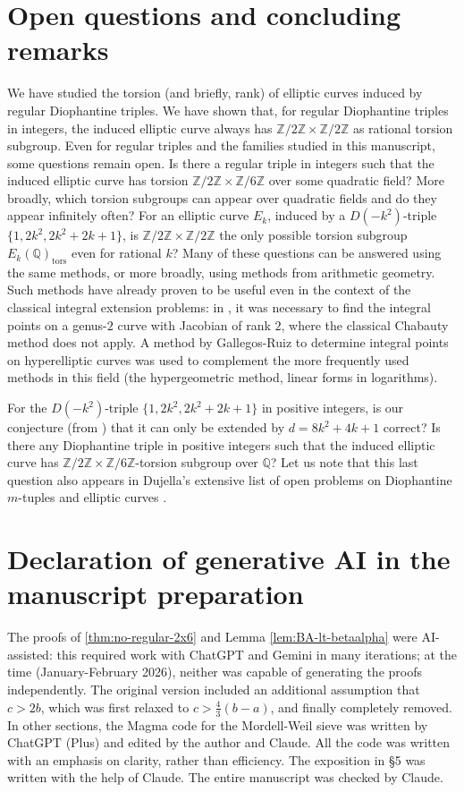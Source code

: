 \documentclass{article}
\theoremstyle{plain}
\newcommand{\Z}{\mathbb{Z}}
\newcommand{\Q}{\mathbb{Q}}
\newcommand{\twotimessix}{\Z/2\Z \times \Z/6\Z}
\newcommand{\tors}{\mathrm{tors}}
\begin{document}
\section{Open questions and concluding remarks}
We have studied the torsion (and briefly, rank) of elliptic curves induced by regular Diophantine triples. We have shown that, for regular Diophantine triples in integers, the induced elliptic curve always has \(\Z/2\Z \times \Z/2\Z\) as rational torsion subgroup. Even for regular triples and the families studied in this manuscript, some questions remain open. Is there a regular triple in integers such that the induced elliptic curve has torsion \( \twotimessix\) over some quadratic field? More broadly, which torsion subgroups can appear over quadratic fields and do they appear infinitely often? For an elliptic curve \(E_k\), induced by a \(D(-k^2)\)-triple \(\{1, 2k^2, 2k^2+2k+1\}\), is \(\Z/2\Z \times \Z/2\Z\) the only possible torsion subgroup \(E_k(\Q)_\tors\) even for rational \(k\)? Many of these questions can be answered using the same methods, or more broadly, using methods from arithmetic geometry. Such methods have already proven to be useful even in the context of the classical integral extension problems: in \cite{AFFu}, it was necessary to find the integral points on a genus-\(2\) curve with Jacobian of rank \(2\), where the classical Chabauty method does not apply. A method by Gallegos-Ruiz \cite{GallegosRuiz2010,GallegosRuiz2019} to determine integral points on hyperelliptic curves was used to complement the more frequently used methods in this field (the hypergeometric method, linear forms in logarithms).


For the \(D(-k^2)\)-triple \(\{1, 2k^2, 2k^2+2k+1\}\) in positive integers, is our conjecture (from \cite[§4]{AF}) that it can only be extended by $d=8k^2+4k+1$ correct?
Is there any Diophantine triple in positive integers such that the induced elliptic curve has \(\twotimessix\)-torsion subgroup over \( \Q\)? Let us note that this last question also appears in Dujella's extensive list of open problems on Diophantine \(m\)-tuples and elliptic curves \cite{DujeOpenProblems2026}.

\section*{Declaration of generative AI in the manuscript preparation}
The proofs of \cref{thm:no-regular-2x6} and Lemma \ref{lem:BA-lt-betaalpha} were AI-assisted: this required work with ChatGPT and Gemini in many iterations; at the time (January-February 2026), neither was capable of generating the proofs independently. The original version included an additional assumption that \(c > 2b\), which was first relaxed to \(c > \frac 43 (b-a)\), and finally completely removed. In other sections, the Magma code for the Mordell-Weil sieve was written by ChatGPT (Plus) and edited by the author and Claude. All the code was written with an emphasis on clarity, rather than efficiency. The exposition in §5 was written with the help of Claude. The entire manuscript was checked by Claude.
\end{document}
